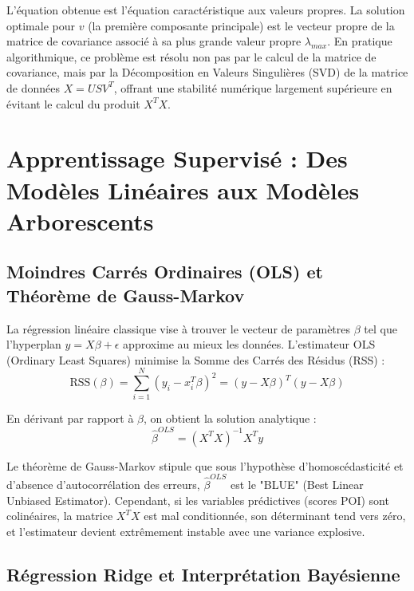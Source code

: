 \documentclass[11pt,a4paper,twoside]{report}
\begin{document}
L'équation obtenue est l'équation caractéristique aux valeurs propres. La solution optimale pour $v$ (la première composante principale) est le vecteur propre de la matrice de covariance associé à sa plus grande valeur propre $\lambda_{max}$.
En pratique algorithmique, ce problème est résolu non pas par le calcul de la matrice de covariance, mais par la Décomposition en Valeurs Singulières (SVD) de la matrice de données $X = U S V^T$, offrant une stabilité numérique largement supérieure en évitant le calcul du produit $X^T X$.

\section{Apprentissage Supervisé : Des Modèles Linéaires aux Modèles Arborescents \cite{bishop2006}}

\subsection{Moindres Carrés Ordinaires (OLS) et Théorème de Gauss-Markov}

La régression linéaire classique vise à trouver le vecteur de paramètres $\beta$ tel que l'hyperplan $y = X\beta + \epsilon$ approxime au mieux les données. L'estimateur OLS (Ordinary Least Squares) minimise la Somme des Carrés des Résidus (RSS) :
\begin{equation}
\text{RSS}(\beta) = \sum_{i=1}^{N} (y_i - x_i^T \beta)^2 = (y - X\beta)^T(y - X\beta)
\end{equation}

En dérivant par rapport à $\beta$, on obtient la solution analytique :
\begin{equation}
\hat{\beta}^{OLS} = (X^T X)^{-1} X^T y
\end{equation}

Le théorème de Gauss-Markov stipule que sous l'hypothèse d'homoscédasticité et d'absence d'autocorrélation des erreurs, $\hat{\beta}^{OLS}$ est le "BLUE" (Best Linear Unbiased Estimator). Cependant, si les variables prédictives (scores POI) sont colinéaires, la matrice $X^T X$ est mal conditionnée, son déterminant tend vers zéro, et l'estimateur devient extrêmement instable avec une variance explosive.

\subsection{Régression Ridge et Interprétation Bayésienne}
\end{document}
